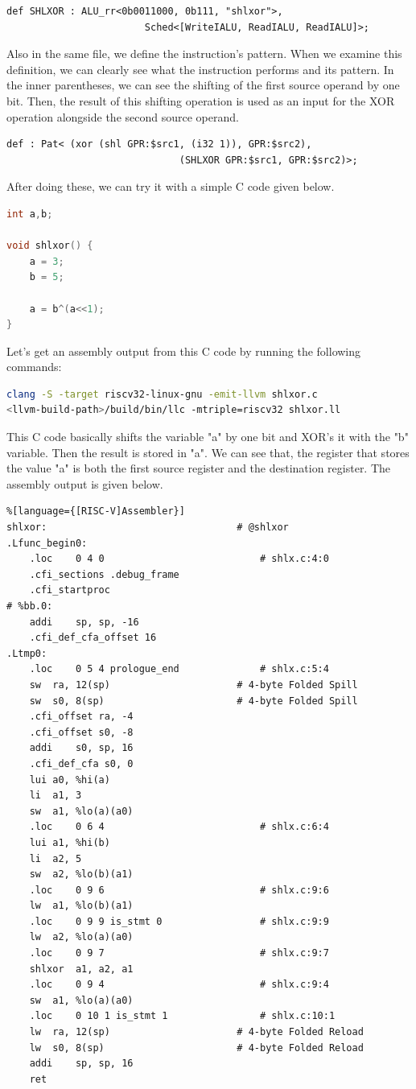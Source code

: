 \begin{lstlisting}
def SHLXOR : ALU_rr<0b0011000, 0b111, "shlxor">,
                        Sched<[WriteIALU, ReadIALU, ReadIALU]>;
\end{lstlisting}

Also in the same file, we define the instruction’s pattern. When we examine this definition, we can clearly see what the instruction performs and its pattern. In the inner parentheses, we can see the shifting of the first source operand by one bit. Then, the result of this shifting operation is used as an input for the XOR operation alongside the second source operand.

\begin{lstlisting}
def : Pat< (xor (shl GPR:$src1, (i32 1)), GPR:$src2),
                              (SHLXOR GPR:$src1, GPR:$src2)>;
\end{lstlisting}

After doing these, we can try it with a simple C code given below. 

\begin{lstlisting}[language=C++]
int a,b;

void shlxor() {
	a = 3;
	b = 5;
		
	a = b^(a<<1);
}
\end{lstlisting}

Let’s get an assembly output from this C code by running the following commands:

\begin{lstlisting}[language=Bash]
clang -S -target riscv32-linux-gnu -emit-llvm shlxor.c
<llvm-build-path>/build/bin/llc -mtriple=riscv32 shlxor.ll
\end{lstlisting}


This C code basically shifts the variable "a" by one bit and XOR’s it with the "b" variable. Then the result is stored in "a". We can see that, the register that stores the value "a" is both the first source register and the destination register. The assembly output is given below.
\begin{lstlisting}%[language={[RISC-V]Assembler}]
shlxor:                                 # @shlxor
.Lfunc_begin0:
	.loc	0 4 0                           # shlx.c:4:0
	.cfi_sections .debug_frame
	.cfi_startproc
# %bb.0:
	addi	sp, sp, -16
	.cfi_def_cfa_offset 16
.Ltmp0:
	.loc	0 5 4 prologue_end              # shlx.c:5:4
	sw	ra, 12(sp)                      # 4-byte Folded Spill
	sw	s0, 8(sp)                       # 4-byte Folded Spill
	.cfi_offset ra, -4
	.cfi_offset s0, -8
	addi	s0, sp, 16
	.cfi_def_cfa s0, 0
	lui	a0, %hi(a)
	li	a1, 3
	sw	a1, %lo(a)(a0)
	.loc	0 6 4                           # shlx.c:6:4
	lui	a1, %hi(b)
	li	a2, 5
	sw	a2, %lo(b)(a1)
	.loc	0 9 6                           # shlx.c:9:6
	lw	a1, %lo(b)(a1)
	.loc	0 9 9 is_stmt 0                 # shlx.c:9:9
	lw	a2, %lo(a)(a0)
	.loc	0 9 7                           # shlx.c:9:7
	shlxor	a1, a2, a1
	.loc	0 9 4                           # shlx.c:9:4
	sw	a1, %lo(a)(a0)
	.loc	0 10 1 is_stmt 1                # shlx.c:10:1
	lw	ra, 12(sp)                      # 4-byte Folded Reload
	lw	s0, 8(sp)                       # 4-byte Folded Reload
	addi	sp, sp, 16
	ret
\end{lstlisting}

